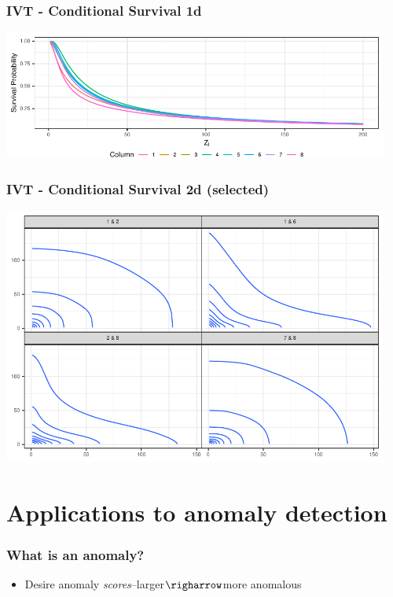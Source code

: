 \documentclass[aspectratio=169]{beamer}
\begin{document}
\begin{frame}
  \frametitle{IVT - Conditional Survival 1d}
  \begin{center}
    \includegraphics[width = 5in]{./images/condsurv_1d}
  \end{center}
\end{frame}

\begin{frame}
  \frametitle{IVT - Conditional Survival 2d (selected)}
  \begin{center}
    \includegraphics[width = 5in]{./images/condsurv_2d}
  \end{center}
\end{frame}

\section{Applications to anomaly detection}

\begin{frame}
  \frametitle{What is an anomaly?}
  \begin{itemize}
    \items Anomalies are:
      \begin{itemize}
        \item Observations with large outliers?
        \item Observations with outsized effects?
        \item Data that is \emph{different}.
        \item Data from regions of data sparsity
      \end{itemize}
    \item Desire anomaly \emph{scores}--larger$\righarrow$more anomalous
  \end{itemize}
\end{frame}
\end{document}

